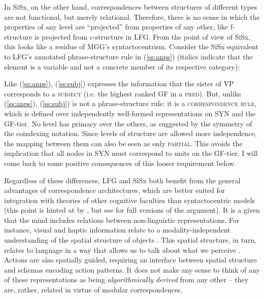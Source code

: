 \documentclass[output=paper,hidelinks]{langscibook}
\begin{document}
In SiSx, on the other hand, correspondences between structures of different types are not functional, but merely relational. Therefore, there is no sense in which the properties of any level are ``projected'' from properties of any other, like f-structure is projected from c-structure in LFG. From the point of view of SiSx, this looks like a residue of MGG's syntactocentrism. Consider the SiSx equivalent to LFG's annotated phrase-structure rule in (\ref{ss:anps}) (italics indicate that the element is a variable and not a concrete member of its respective category):







Like (\ref{ss:anps}), (\ref{ss:subj}) expresses the information that the sister of VP corresponds to a \textsc{subject} (i.e. the highest ranked GF in a \textsc{pred}). But, unlike (\ref{ss:anps}), (\ref{ss:subj}) is not a phrase-structure rule: it is a \textsc{correspondence rule}, which is defined over independently well-formed representations on SYN and the GF-tier. No level has primacy over the others, as suggested by the symmetry of the coindexing notation. Since levels of structure are allowed more independence, the mapping between them can also be seen as only \textsc{partial}. This avoids the implication that all nodes in SYN must correspond to units on the GF-tier. I will come back to some positive consequences of this looser requirement below.



  
Regardless of these differences, LFG and SiSx both benefit from the general advantages of correspondence architectures, which are  better suited for integration with theories of other cognitive faculties than syntactocentric models (this point is hinted at by \citet[45]{bresnan1993interaction}, but see \citet{jackendoff2007parallel, jackendoff2011what} for full versions of the argument). It is a given that the mind includes relations between non-linguistic representations. For instance, visual and haptic information relate to a modality-independent understanding of the spatial structure of objects \citep{marr1982vision}. This spatial structure, in turn, relates to language in a way that allows us to talk about what we perceive \citep{jackendoff1987beyond, landau1993and}. Actions are also spatially guided, requiring an interface between spatial structure and schemas encoding action patterns. It does not make any sense to think of any of these representations as being \textit{algorithmically derived} from any other -- they are, rather, related in virtue of modular correspondences. 
\end{document}

